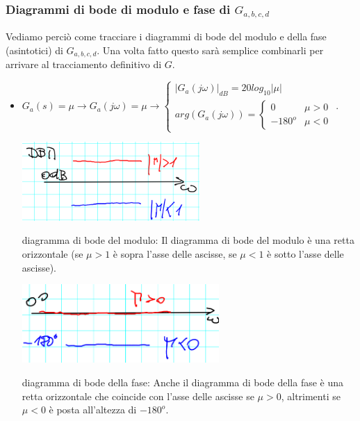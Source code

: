 \subsubsection{Diagrammi di bode di modulo e fase di $G_{a,b,c,d}$}
Vediamo perciò come tracciare i diagrammi di bode del modulo e della fase (asintotici) di $G_{a,b,c,d}$. Una volta fatto questo sarà semplice combinarli per arrivare al tracciamento definitivo di $G$.
\begin{itemize}
    \item $G_a(s) = \mu \rightarrow  G_a(j \omega) = \mu \rightarrow \begin{cases}
        |G_a(j \omega)|_{dB} = 20 log_{10}|\mu|\\
        arg(G_a(j \omega)) = \begin{cases}
            0 \;\;\; & \mu>0\\
            -180^o & \mu<0
        \end{cases}
    \end{cases}$.\newline
    \begin{center}
        \includegraphics[height=3cm]{../lezione12/img4.PNG}
    \end{center}
    diagramma di bode del modulo: Il diagramma di bode del modulo è una retta orizzontale (se $\mu > 1$ è sopra l'asse delle ascisse, se $\mu < 1$ è sotto l'asse delle ascisse).\newline
    \begin{center}
        \includegraphics[height=3cm]{../lezione12/img5.PNG}
    \end{center}
    diagramma di bode della fase: Anche il diagramma di bode della fase è una retta orizzontale che coincide con l'asse delle ascisse se $\mu>0$, altrimenti se $\mu<0$ è posta all'altezza di $-180^o$.
\end{itemize}